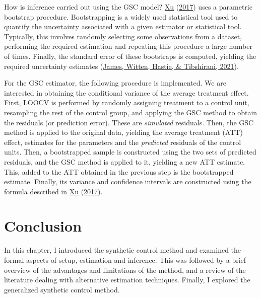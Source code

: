\documentclass[12pt,nobind, a4paper]{reedthesis}
\begin{document}
 How is inference carried out using the GSC model? \protect\hyperlink{ref-xu_generalized_2017}{Xu} (\protect\hyperlink{ref-xu_generalized_2017}{2017}) uses a parametric bootstrap procedure. Bootstrapping is a widely used statistical tool used to quantify the uncertainty associated with a given estimator or statistical tool. Typically, this involves randomly selecting some observations from a dataset, performing the required estimation and repeating this procedure a large number of times. Finally, the standard error of these bootstraps is computed, yielding the required uncertainty estimates (\protect\hyperlink{ref-james_introduction_2021}{James, Witten, Hastie, \& Tibshirani, 2021}).
 \linebreak

 For the GSC estimator, the following procedure is implemented. We are interested in obtaining the conditional variance of the average treatment effect. First, LOOCV is performed by randomly assigning treatment to a control unit, resampling the rest of the control group, and applying the GSC method to obtain the residuals (or prediction error). These are \textit{simulated} residuals. Then, the GSC method is applied to the original data, yielding the average treatment (ATT) effect, estimates for the parameters and the \textit{predicted} residuals of the control units. Then, a bootstrapped sample is constructed using the two sets of predicted residuals, and the GSC method is applied to it, yielding a new ATT estimate. This, added to the ATT obtained in the previous step is the bootstrapped estimate. Finally, its variance and confidence intervals are constructed using the formula described in \protect\hyperlink{ref-xu_generalized_2017}{Xu} (\protect\hyperlink{ref-xu_generalized_2017}{2017}).

 \hypertarget{conc}{%
 \section{Conclusion}\label{conc}}

 In this chapter, I introduced the synthetic control method and examined the formal aspects of setup, estimation and inference. This was followed by a brief overview of the advantages and limitations of the method, and a review of the literature dealing with alternative estimation techniques. Finally, I explored the generalized synthetic control method.
\end{document}
